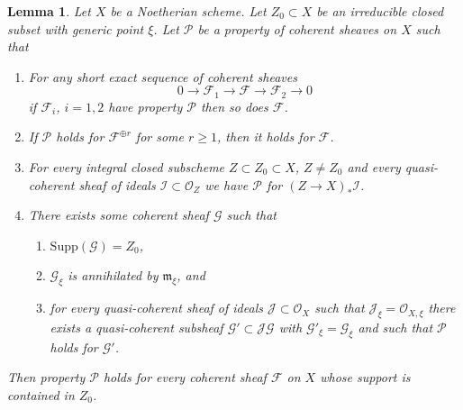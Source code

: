 \documentclass{stacks-project}
\theoremstyle{plain}
\newtheorem{lemma}[subsection]{Lemma}
\theoremstyle{definition}
\theoremstyle{remark}
\numberwithin{equation}{subsection}
\begin{document}
\begin{lemma}
\label{lemma-property-irreducible-higher-rank-cohomological}
Let $X$ be a Noetherian scheme. Let $Z_0 \subset X$ be an irreducible
closed subset with generic point $\xi$. Let $\mathcal{P}$ be a property
of coherent sheaves on $X$ such that
\begin{enumerate}
\item For any short exact sequence of coherent sheaves
$$
0 \to \mathcal{F}_1 \to \mathcal{F} \to \mathcal{F}_2 \to 0
$$
if $\mathcal{F}_i$, $i = 1, 2$ have property $\mathcal{P}$
then so does $\mathcal{F}$.
\item If $\mathcal{P}$ holds for $\mathcal{F}^{\oplus r}$ for
some $r \geq 1$, then it holds for $\mathcal{F}$.
\item For every integral closed subscheme $Z \subset Z_0 \subset X$,
$Z \not = Z_0$ and every quasi-coherent sheaf of ideals
$\mathcal{I} \subset \mathcal{O}_Z$ we have
$\mathcal{P}$ for $(Z \to X)_*\mathcal{I}$.
\item There exists some coherent sheaf $\mathcal{G}$ such that
\begin{enumerate}
\item $\text{Supp}(\mathcal{G}) = Z_0$,
\item $\mathcal{G}_\xi$ is annihilated by $\mathfrak m_\xi$, and
\item for every quasi-coherent sheaf of ideals
$\mathcal{J} \subset \mathcal{O}_X$ such that
$\mathcal{J}_\xi = \mathcal{O}_{X, \xi}$ there exists a quasi-coherent
subsheaf $\mathcal{G}' \subset \mathcal{J}\mathcal{G}$ with
$\mathcal{G}'_\xi = \mathcal{G}_\xi$ and such that
$\mathcal{P}$ holds for $\mathcal{G}'$.
\end{enumerate}
\end{enumerate}
Then property $\mathcal{P}$ holds for every coherent sheaf
$\mathcal{F}$ on $X$ whose support is contained in $Z_0$.
\end{lemma}
\end{document}
